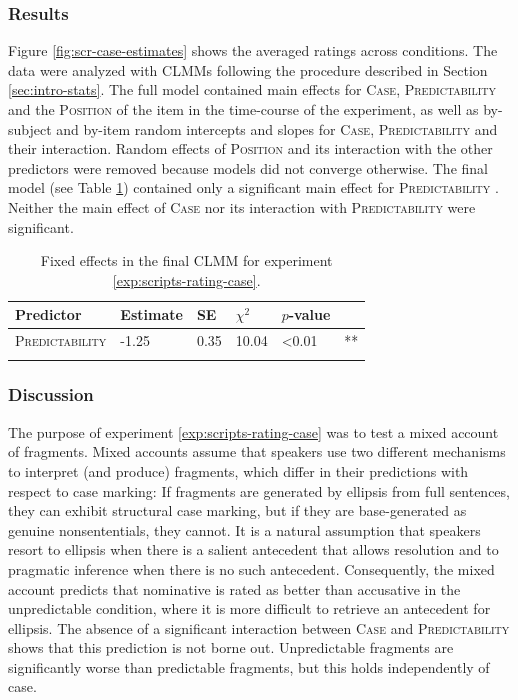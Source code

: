 \subsubsection{Results}
Figure \ref{fig:scr-case-estimates} shows the averaged ratings across conditions. The data were analyzed with CLMMs following the procedure described in Section \ref{sec:intro-stats}. The full model contained main effects for \textsc{Case}, \textsc{Predictability} and the \textsc{Position} of the item in the time-course of the experiment, as well as by-subject and by-item random intercepts and slopes for \textsc{Case}, \textsc{Predictability} and their interaction. Random effects of \textsc{Position} and its interaction with the other predictors were removed because models did not converge otherwise. The final model (see Table \ref{tab:scripts-case-estimates}) contained only a significant main effect for \textsc{Predictability} . Neither the main effect of \textsc{Case}  nor its interaction with \textsc{Predictability}  were significant.

\begin{table}[t]
\begin{tabular}{l l l l l l}
\lsptoprule
Predictor & Estimate & SE & $\chi^2$ &  $p$-value &  \\   
\midrule
\textsc{Predictability} & -1.25 &  0.35 & 10.04 & \textless 0.01 & ** \\
\lspbottomrule
\end{tabular}
\caption{Fixed effects in the final CLMM for experiment \ref{exp:scripts-rating-case}. \label{tab:scripts-case-estimates}}
\end{table}

\subsubsection{Discussion}
The purpose of experiment \ref{exp:scripts-rating-case} was to test a mixed account of fragments. Mixed accounts assume that speakers use two different mechanisms to interpret (and produce) fragments, which differ in their predictions with respect to case marking: If fragments are generated by ellipsis from full sentences, they can exhibit structural case marking, but if they are base-generated as genuine nonsententials, they cannot. It is a natural assumption that speakers resort to ellipsis when there is a salient antecedent that allows resolution and to pragmatic inference when there is no such antecedent. Consequently, the mixed account predicts that nominative is rated as better than accusative in the unpredictable condition, where it is more difficult to retrieve an antecedent for ellipsis. The absence of a significant interaction between \textsc{Case} and \textsc{Predictability} shows that this prediction is not borne out. Unpredictable fragments are significantly worse than predictable fragments, but this holds independently of case.

